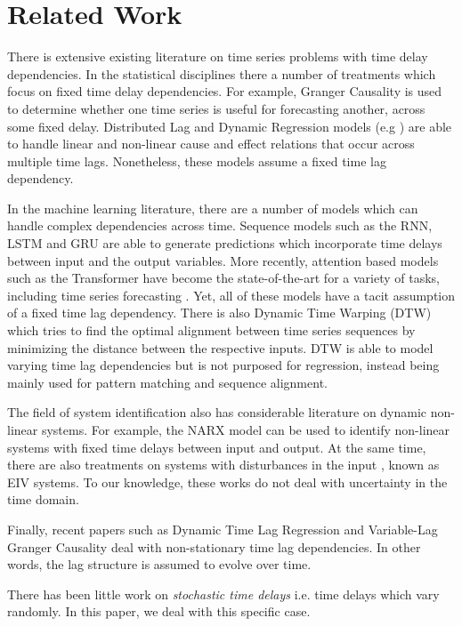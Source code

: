 \documentclass[11pt]{amsart}
\begin{document}
\section{Related Work}
There is extensive existing literature on time series problems with time delay dependencies. In the statistical disciplines there a number of treatments which focus on 
fixed time delay dependencies. For example, Granger Causality \cite{granger} is used to determine whether one time series is useful for forecasting another, across some fixed delay.
Distributed Lag \cite{almon} and Dynamic Regression models (e.g \cite{dynr}) are able to handle linear and non-linear cause and effect relations that occur across multiple time lags.
Nonetheless, these models assume a fixed time lag dependency.

In the machine learning literature, there are a number of models which can handle complex dependencies across time. Sequence models such as the RNN, LSTM and GRU \cite{ml}
are able to generate predictions which incorporate time delays between input and the output variables. More recently, attention based models such as the Transformer have become the state-of-the-art for a
variety of tasks, including time series forecasting \cite{deep_transformers}. Yet, all of these models have a tacit assumption of a fixed time lag dependency. There is also Dynamic Time Warping (DTW) \cite{dtw} which tries to find the optimal alignment between time series sequences by minimizing the
distance between the respective inputs. DTW is able to model varying time lag dependencies but is not purposed for regression, instead being mainly used for pattern matching and sequence alignment.

The field of system identification also has considerable literature on dynamic non-linear systems. For example, the NARX \cite{ml} model can be used to identify 
non-linear systems with fixed time delays between input and output. At the same time, there are also treatments on systems with disturbances in the input \cite{eiv_sysid}, known as EIV systems. To our knowledge,
these works do not deal with uncertainty in the time domain.

Finally, recent papers such as Dynamic Time Lag Regression \cite{dtlr} and Variable-Lag Granger Causality \cite{Amornbunchornvej_2019} deal with non-stationary time lag dependencies. In other words, the lag structure is assumed to evolve over time.

There has been little work on \emph{stochastic time delays} i.e. time delays which vary randomly. In this paper, we deal with this specific case.
\end{document}
